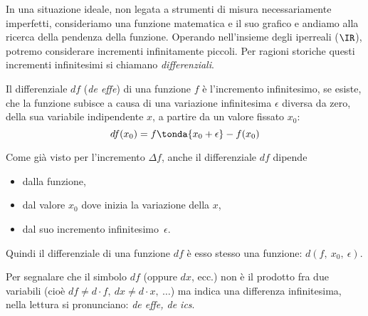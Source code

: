 In una situazione ideale, non legata a strumenti di misura necessariamente 
imperfetti, consideriamo una funzione matematica e il suo grafico e andiamo 
alla ricerca della pendenza della funzione. 
Operando nell'insieme degli iperreali (\(\IR\)), potremo considerare 
incrementi infinitamente piccoli. 
Per ragioni storiche questi incrementi infinitesimi si chiamano 
\emph{differenziali}.
\begin{definizione}
Il differenziale \(df\) (\emph{de effe}) di una funzione \(f\) è 
l'incremento infinitesimo, se esiste, 
che la funzione subisce a causa di una variazione infinitesima 
\(\epsilon\) diversa da zero, della sua variabile indipendente \(x\), 
a partire da un valore fissato \(x_0\):
\[df(x_0) = f \tonda{x_0 + \epsilon} - f(x_0)\]
\end{definizione}
Come già visto per l'incremento \(\Delta f\), anche il differenziale 
\(df\) dipende 
\begin{itemize} [nosep]
\item dalla funzione, 
\item dal valore \(x_0\) dove inizia la variazione della \(x\),
\item dal suo incremento infinitesimo~\(\epsilon\).
\end{itemize}
Quindi il differenziale di una funzione \(df\) è esso stesso  una funzione:
\(d(f,~x_0,~\epsilon)\). 
\begin{osservazione}
Per segnalare che il simbolo \(df\) (oppure \(dx\), ecc.) non è il prodotto 
fra due variabili 
(cioè \(df\ne d \cdot f,\ dx\ne d\cdot x,\ \dots\)) ma indica 
una differenza infinitesima, nella lettura si pronunciano:
\textit{de effe, de ics}.
\end{osservazione}

